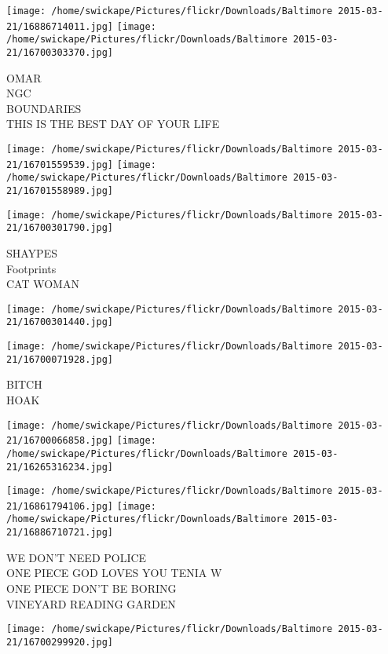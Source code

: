 \documentclass[10pt,letterpaper]{article}
\begin{document}
\texttt{[image: /home/swickape/Pictures/flickr/Downloads/Baltimore 2015-03-21/16886714011.jpg]}
\texttt{[image: /home/swickape/Pictures/flickr/Downloads/Baltimore 2015-03-21/16700303370.jpg]}

OMAR\\
NGC\\
BOUNDARIES\\
THIS IS THE BEST DAY OF YOUR LIFE\\
\pagebreak

\texttt{[image: /home/swickape/Pictures/flickr/Downloads/Baltimore 2015-03-21/16701559539.jpg]}
\texttt{[image: /home/swickape/Pictures/flickr/Downloads/Baltimore 2015-03-21/16701558989.jpg]}

\vspace{0.25in}
\texttt{[image: /home/swickape/Pictures/flickr/Downloads/Baltimore 2015-03-21/16700301790.jpg]}

SHAYPES\\
Footprints\\
CAT WOMAN\\
\pagebreak

\texttt{[image: /home/swickape/Pictures/flickr/Downloads/Baltimore 2015-03-21/16700301440.jpg]}

\vspace{0.25in}
\texttt{[image: /home/swickape/Pictures/flickr/Downloads/Baltimore 2015-03-21/16700071928.jpg]}

BITCH\\
HOAK\\
\pagebreak

\texttt{[image: /home/swickape/Pictures/flickr/Downloads/Baltimore 2015-03-21/16700066858.jpg]}
\texttt{[image: /home/swickape/Pictures/flickr/Downloads/Baltimore 2015-03-21/16265316234.jpg]}

\texttt{[image: /home/swickape/Pictures/flickr/Downloads/Baltimore 2015-03-21/16861794106.jpg]}
\texttt{[image: /home/swickape/Pictures/flickr/Downloads/Baltimore 2015-03-21/16886710721.jpg]}

WE DON'T NEED POLICE\\
ONE PIECE GOD LOVES YOU TENIA W\\
ONE PIECE DON'T BE BORING\\
VINEYARD READING GARDEN\\
\pagebreak

\texttt{[image: /home/swickape/Pictures/flickr/Downloads/Baltimore 2015-03-21/16700299920.jpg]}
\end{document}
